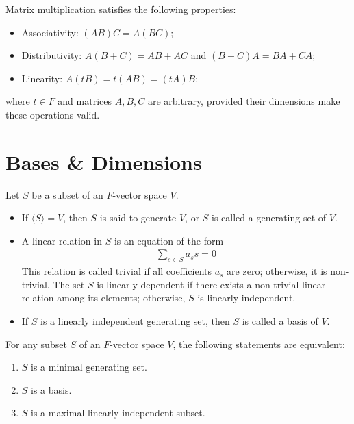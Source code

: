 \begin{proposition}
  Matrix multiplication satisfies the following properties:
  \begin{itemize}
    \item Associativity: $(AB)C = A(BC)$;
    \item Distributivity: $A(B + C) = AB + AC$ and $(B + C)A = BA + CA$;
    \item Linearity: $A(tB) = t(AB) = (tA)B$;
  \end{itemize}
  where $t \in F$ and matrices $A, B, C$ are arbitrary, provided their dimensions make these operations valid.
\end{proposition}

\section{Bases \& Dimensions}

\begin{definition}
  Let $S$ be a subset of an $F$-vector space $V$.
  \begin{itemize}
    \item If $\langle S \rangle = V$, then $S$ is said to generate $V$, or $S$ is called a generating set of $V$.
    \item A linear relation in $S$ is an equation of the form
      \begin{align*}
        \sum_{s \in S} a_s s = 0
      \end{align*}
      This relation is called trivial if all coefficients $a_s$ are zero; otherwise, it is non-trivial. The set $S$ is linearly dependent if there exists a non-trivial linear relation among its elements; otherwise, $S$ is linearly independent.
    \item If $S$ is a linearly independent generating set, then $S$ is called a basis of $V$.
  \end{itemize}
\end{definition}

\begin{lemma}
  For any subset $S$ of an $F$-vector space $V$, the following statements are equivalent:
  \begin{enumerate}
    \item $S$ is a minimal generating set.
    \item $S$ is a basis.
    \item $S$ is a maximal linearly independent subset.
  \end{enumerate}
\end{lemma}

